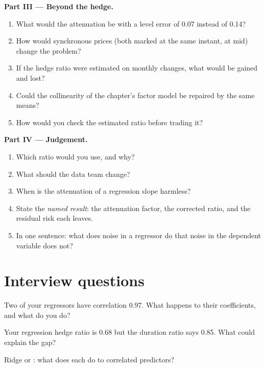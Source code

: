 \begin{problem}
\medskip\noindent\textbf{Part III --- Beyond the hedge.}
\begin{enumerate}[resume]
\item What would the attenuation be with a level error of 0.07 instead of 0.14?
\item How would synchronous prices (both marked at the same instant, at mid) change the problem?
\item If the hedge ratio were estimated on monthly changes, what would be gained and lost?
\item Could the collinearity of the chapter's factor model be repaired by the same means?
\item How would you check the estimated ratio before trading it?
\end{enumerate}

\medskip\noindent\textbf{Part IV --- Judgement.}
\begin{enumerate}[resume]
\item Which ratio would you use, and why?
\item What should the data team change?
\item When is the attenuation of a regression slope harmless?
\item State the \emph{named result}: the attenuation factor, the corrected ratio, and the residual risk each leaves.
\item In one sentence: what does noise in a regressor do that noise in the dependent variable does not?
\end{enumerate}
\end{problem}

\section{Interview questions}

\begin{interviewq}\label{iq:qm:linear-models-under-stress:1}
Two of your regressors have correlation 0.97. What happens to their coefficients, and what do you do?
\end{interviewq}

\begin{interviewq}\label{iq:qm:linear-models-under-stress:2}
Your regression hedge ratio is 0.68 but the duration ratio says 0.85. What could explain the gap?
\end{interviewq}

\begin{interviewq}\label{iq:qm:linear-models-under-stress:3}
Ridge or : what does each do to correlated predictors?
\end{interviewq}

